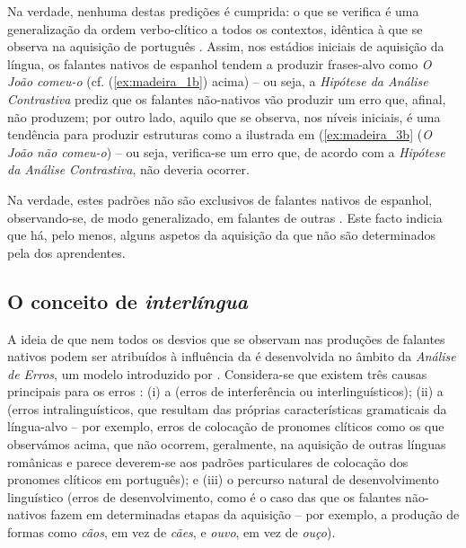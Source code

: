 \documentclass[output=paper]{LSP/langsci}
\begin{document}
Na verdade, nenhuma destas predições é cumprida: o que se verifica é uma generalização da ordem verbo-clítico a todos os contextos, idêntica à que se observa na aquisição de português  \citep{costa_etal2015}. Assim, nos estádios iniciais de aquisição da língua, os falantes nativos de espanhol tendem a produzir frases-alvo como \textit{O João comeu-o} (cf. (\ref{ex:madeira_1b}) acima) – ou seja, a \textit{Hipótese da Análise Contrastiva} prediz que os falantes não-nativos vão produzir um erro que, afinal, não produzem; por outro lado, aquilo que se observa, nos níveis iniciais, é uma tendência para produzir estruturas como a ilustrada em (\ref{ex:madeira_3b} (\textit{O João não comeu-o}) – ou seja, verifica-se um erro que, de acordo com a \textit{Hipótese da Análise Contrastiva}, não deveria ocorrer.

Na verdade, estes padrões não são exclusivos de falantes nativos de espanhol, observando-se, de modo generalizado, em falantes de outras . Este facto indicia que há, pelo menos, alguns aspetos da aquisição da  que não são determinados pela  dos aprendentes. 

\subsection{O conceito de \textit{interlíngua}}
\label{subsec:madeira_interlingua}
A ideia de que nem todos os desvios que se observam nas produções de falantes nativos podem ser atribuídos à influência da  é desenvolvida no âmbito da \textit{Análise de Erros}, um modelo introduzido por \citet{corder1967}. Considera-se que existem três causas principais para os erros \citep{richards1971}: (i) a  (erros de interferência ou interlinguísticos); (ii) a  (erros intralinguísticos, que resultam das próprias características gramaticais da língua-alvo – por exemplo, erros de colocação de pronomes clíticos como os que observámos acima, que não ocorrem, geralmente, na aquisição de outras línguas românicas e parece deverem-se aos padrões particulares de colocação dos pronomes clíticos em português); e (iii) o percurso natural de desenvolvimento linguístico (erros de desenvolvimento, como é o caso das  que os falantes não-nativos fazem em determinadas etapas da aquisição – por exemplo, a produção de formas como \textit{cãos}, em vez de \textit{cães}, e \textit{ouvo}, em vez de \textit{ouço}).
\end{document}
